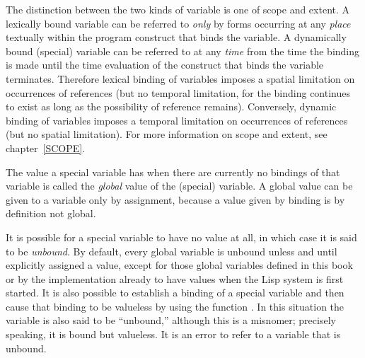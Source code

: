 The distinction between the two kinds of variable is one of scope
and extent.  A lexically bound variable can be referred to {\it only}
by forms occurring at any {\it place} textually within the program construct that
binds the variable.  A dynamically bound (special) variable can
be referred to at any {\it time} from the time the binding is made
until the time evaluation of the construct that binds the variable
terminates.  Therefore lexical binding of variables
imposes a spatial limitation
on occurrences of references (but no temporal limitation, for the
binding continues to exist as long as the possibility of reference
remains).  Conversely, dynamic binding of variables imposes a temporal
limitation on occurrences of references (but no spatial limitation).
For more information on scope and extent, see chapter~\ref{SCOPE}.

The value a special variable has when there are currently
no bindings of that variable is called the {\it global} value of the
(special) variable.
A global value can be given to a variable only by assignment,
because a value given by binding is by definition not global.

It is possible for a special variable to have no value at all,
in which case it is said to be {\it unbound}.
By default, every global variable is unbound unless and until
explicitly assigned a value, except for those global variables
defined in this book or by the implementation already to have values
when the Lisp system is first started.
It is also possible to establish a binding of a special variable
and then cause that binding to be valueless by using the
function .  In this situation the variable
is also said to be ``unbound,'' although this is a misnomer;
precisely speaking, it is bound but valueless.
It is an error to refer to a variable that is unbound.

